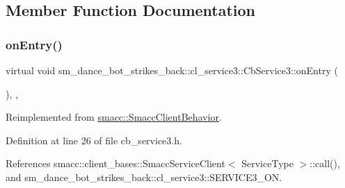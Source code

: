\subsection{Member Function Documentation}
\mbox{\label{classsm__dance__bot__strikes__back_1_1cl__service3_1_1CbService3_a09a2fda38973e1e3915b63a47ca67ed1}} 
\subsubsection{\texorpdfstring{on\+Entry()}{onEntry()}}
{\footnotesize\ttfamily virtual void sm\+\_\+dance\+\_\+bot\+\_\+strikes\+\_\+back\+::cl\+\_\+service3\+::\+Cb\+Service3\+::on\+Entry (\begin{DoxyParamCaption}{ }\end{DoxyParamCaption})\hspace{0.3cm}{\ttfamily [inline]}, {\ttfamily [override]}, {\ttfamily [virtual]}}



Reimplemented from \hyperlink{classsmacc_1_1SmaccClientBehavior_ad5d3e1f1697c3cfe66c94cadba948493}{smacc\+::\+Smacc\+Client\+Behavior}.



Definition at line 26 of file cb\+\_\+service3.\+h.



References smacc\+::client\+\_\+bases\+::\+Smacc\+Service\+Client$<$ Service\+Type $>$\+::call(), and sm\+\_\+dance\+\_\+bot\+\_\+strikes\+\_\+back\+::cl\+\_\+service3\+::\+S\+E\+R\+V\+I\+C\+E3\+\_\+\+ON.


